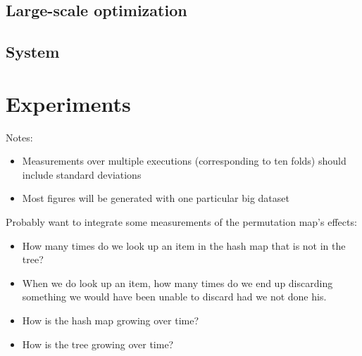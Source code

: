 \subsection{Large-scale optimization}

\subsection{System}

\section{Experiments}

Notes:
\begin{itemize}

\item Measurements over multiple executions (corresponding to ten folds)
should include standard deviations

\item Most figures will be generated with one particular big dataset
\end{itemize}

Probably want to integrate some measurements of the permutation map's effects:
\begin{itemize}
\item How many times do we look up an item in the hash map that is not in the tree?

\item When we do look up an item, how many times do we end up discarding
      something we would have been unable to discard had we not done his.

\item How is the hash map growing over time?

\item How is the tree growing over time?
\end{itemize}

